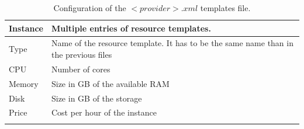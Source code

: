 \newpage

\bgroup
  \def\arraystretch{1.5}
  \begin{longtable}{| p{} | p{} |}
      \hline
      \textbf{Instance} 	& Multiple entries of resource templates. \\ \hline
      Type   			& Name of the resource template. It has to be the same name than in the previous files \\ \hline
      CPU    			& Number of cores \\ \hline
      Memory 			& Size in GB of the available RAM \\ \hline
      Disk   			& Size in GB of the storage \\ \hline
      Price  			& Cost per hour of the instance \\ \hline
      \caption{Configuration of the $<provider>.xml$ templates file.}
      \label{tab:rOCCI_configuration}
  \end{longtable}
\egroup


